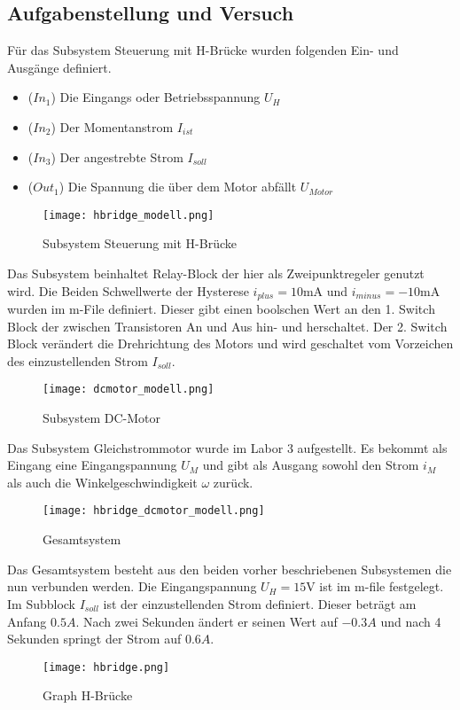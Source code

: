 \subsection{Aufgabenstellung und Versuch}

Für das Subsystem Steuerung mit H-Brücke wurden folgenden Ein- und Ausgänge
definiert.\\

\begin{itemize}
    \item ($In_1$) Die Eingangs oder Betriebsspannung $U_H$
    \item ($In_2$) Der Momentanstrom $I_{ist}$
    \item ($In_3$) Der angestrebte Strom $I_{soll}$
    \item ($Out_1$) Die Spannung die über dem Motor abfällt $U_{Motor}$
\end{itemize}


\begin{figure}[H]
    \centering
    \texttt{[image: hbridge\_modell.png]}
    \caption{Subsystem Steuerung mit H-Brücke}
    \label{fig:Subsystem H-Bridge}
\end{figure}

Das Subsystem beinhaltet Relay-Block der hier als Zweipunktregeler genutzt
wird. Die Beiden Schwellwerte der Hysterese $i_{plus}=10\mathrm{mA}$ und
$i_{minus}=-10\mathrm{mA}$ wurden im m-File definiert. Dieser gibt einen
boolschen Wert an den 1. Switch Block der zwischen Transistoren An und Aus
hin- und herschaltet. Der 2. Switch Block verändert die Drehrichtung des
Motors und wird geschaltet vom Vorzeichen des einzustellenden Strom $I_{soll}$.\\

\begin{figure}[H]
    \centering
    \texttt{[image: dcmotor\_modell.png]}
    \caption{Subsystem DC-Motor}
    \label{fig:Subsystem DC-Motor}
\end{figure}

Das Subsystem Gleichstrommotor wurde im Labor 3 aufgestellt. Es bekommt
als Eingang eine Eingangspannung $U_M$ und gibt als Ausgang sowohl den
Strom $i_M$ als auch die Winkelgeschwindigkeit $\omega$ zurück.

\begin{figure}[H]
    \centering
    \texttt{[image: hbridge\_dcmotor\_modell.png]}
    \caption{Gesamtsystem}
    \label{fig:Gesamtsystem}
\end{figure}

Das Gesamtsystem besteht aus den beiden vorher beschriebenen Subsystemen die nun
verbunden werden. Die Eingangspannung $U_H=15\mathrm{V}$ ist im m-file festgelegt.
Im Subblock $I_{soll}$ ist der einzustellenden Strom definiert. Dieser beträgt
am Anfang $0.5A$. Nach zwei Sekunden ändert er seinen Wert auf $-0.3A$ und nach
4 Sekunden springt der Strom auf $0.6A$.



\begin{figure}[H]
    \centering
    \texttt{[image: hbridge.png]}
    \caption{Graph H-Brücke}
    \label{fig:Graph H-Bridge}
\end{figure}